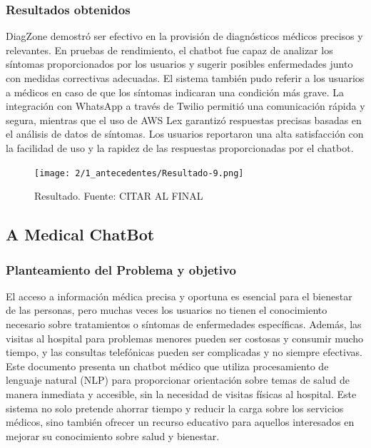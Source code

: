 \subsubsection{Resultados obtenidos}
	DiagZone demostró ser efectivo en la provisión de diagnósticos médicos precisos y relevantes. En pruebas de rendimiento, el chatbot fue capaz de analizar los síntomas proporcionados por los usuarios y sugerir posibles enfermedades junto con medidas correctivas adecuadas. El sistema también pudo referir a los usuarios a médicos en caso de que los síntomas indicaran una condición más grave. La integración con WhatsApp a través de Twilio permitió una comunicación rápida y segura, mientras que el uso de AWS Lex garantizó respuestas precisas basadas en el análisis de datos de síntomas. Los usuarios reportaron una alta satisfacción con la facilidad de uso y la rapidez de las respuestas proporcionadas por el chatbot.


\begin{figure}[h]
	\begin{center}
		\texttt{[image: 2/1\_antecedentes/Resultado-9.png]}
		\caption{Resultado. Fuente: CITAR AL FINAL }
	\end{center}
\end{figure}


 \subsection{A Medical ChatBot} %

\subsubsection{Planteamiento del Problema y objetivo}
	El acceso a información médica precisa y oportuna es esencial para el bienestar de las personas, pero muchas veces los usuarios no tienen el conocimiento necesario sobre tratamientos o síntomas de enfermedades específicas. Además, las visitas al hospital para problemas menores pueden ser costosas y consumir mucho tiempo, y las consultas telefónicas pueden ser complicadas y no siempre efectivas. Este documento presenta un chatbot médico que utiliza procesamiento de lenguaje natural (NLP) para proporcionar orientación sobre temas de salud de manera inmediata y accesible, sin la necesidad de visitas físicas al hospital. Este sistema no solo pretende ahorrar tiempo y reducir la carga sobre los servicios médicos, sino también ofrecer un recurso educativo para aquellos interesados en mejorar su conocimiento sobre salud y bienestar.

